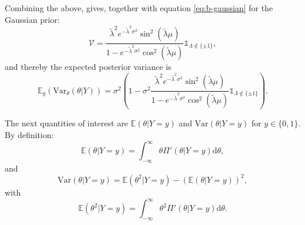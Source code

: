 \documentclass[]{report}
\begin{document}
Combining the above, gives, together with equation \eqref{eq:b-gaussian} for the Gaussian prior:
\begin{equation}
    \mathcal{V} = \frac{\tilde{\lambda}^2 e^{-\tilde{\lambda}^2\sigma^2} \sin^2(\tilde{\lambda}\mu)}{1-e^{-\tilde{\lambda}^2\sigma^2} \cos^2(\tilde{\lambda}\mu)}\mathbb{1}_{\Lambda \notin \{\pm1\}},
\end{equation}
and thereby the expected posterior variance is
\begin{equation}
    \mathbb{E}_y(\text{Var}_{\theta}(\theta | Y)) = \sigma^2(1-\sigma^2\frac{\tilde{\lambda}^2 e^{-\tilde{\lambda}^2\sigma^2} \sin^2(\tilde{\lambda}\mu)}{1-e^{-\tilde{\lambda}^2\sigma^2} \cos^2(\tilde{\lambda}\mu)}\mathbb{1}_{\Lambda \notin \{\pm1\}}).
\end{equation}

The next quantities of interest are $\mathbb{E}(\theta | Y=y)$ and $\text{Var}(\theta|Y=y)$ for $y\in \{0,1\}$. By definition:
\begin{equation}
    \mathbb{E}(\theta | Y=y) = \int_{-\infty}^{\infty} \theta \Pi'(\theta|Y=y)\text{d}\theta,
\end{equation}
and
\begin{equation}
    \text{Var}(\theta|Y=y) = \mathbb{E}(\theta^2 | Y=y) - (\mathbb{E}(\theta | Y=y))^2,
\end{equation}
with
\begin{equation}
    \mathbb{E}(\theta^2 | Y=y) = \int_{-\infty}^{\infty} \theta^2 \Pi'(\theta|Y=y)\text{d}\theta.
\end{equation}
\end{document}
